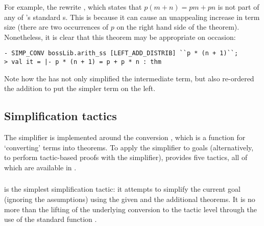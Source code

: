 For example, the rewrite , which
states that $p(m + n) = pm + pn$ is not part of any of \HOL's standard
\simpset{}s.  This is because it can cause an unappealing increase in
term size (there are two occurrences of $p$ on the right hand
side of the theorem).  Nonetheless, it is clear that this theorem may
be appropriate on occasion:
\begin{session}
\begin{verbatim}
- SIMP_CONV bossLib.arith_ss [LEFT_ADD_DISTRIB] ``p * (n + 1)``;
> val it = |- p * (n + 1) = p + p * n : thm
\end{verbatim}
\end{session}
Note how the  \simpset{} has not only simplified the
intermediate  term, but also re-ordered the addition to
put the simpler term on the left.

\subsection{Simplification tactics}
\label{sec:simplification-tactics}

The simplifier is implemented around the conversion ,
which is a function for `converting' terms into theorems.  To apply
the simplifier to goals (alternatively, to perform tactic-based proofs
with the simplifier), \HOL{} provides five tactics, all of which are
available in .

\subsubsection{}

 is the simplest simplification tactic: it attempts to
simplify the current goal (ignoring the assumptions) using the given
\simpset{} and the additional theorems.  It is no more than the
lifting of the underlying  conversion to the tactic
level through the use of the standard function .

\subsubsection{}

